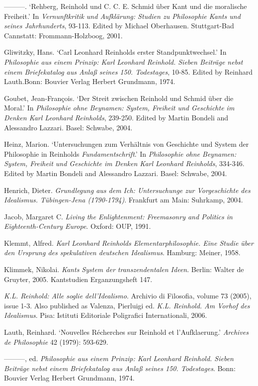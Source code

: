 {---}{---}{---}. `Rehberg, Reinhold und C. C. E. Schmid \"{u}ber Kant und die moralische Freiheit.' In \textit{Vernunftkritik und Aufkl\"{a}rung: Studien zu Philosophie Kants und seines Jahrhunderts}, 93{-}113. Edited by Michael Oberhausen. Stuttgart{-}Bad Cannstatt: Frommann{-}Holzboog, 2001. 

Gliwitzky, Hans. `Carl Leonhard Reinholds erster Standpunktwechsel.' In \textit{Philosophie aus einem Prinzip: Karl Leonhard Reinhold. Sieben Beitr\"{a}ge nebst einem Briefekatalog aus Anla\ss{} seines 150. Todestages}, 10{-}85. Edited by Reinhard Lauth.Bonn: Bouvier Verlag Herbert Grundmann, 1974.

Goubet, Jean{-}Fran\c{c}ois. `Der Streit zwischen Reinhold und Schmid \"{u}ber die Moral.' In \textit{Philosophie ohne Beynamen: System, Freiheit und Geschichte im Denken Karl Leonhard Reinholds}, 239{-}250. Edited by Martin Bondeli and Alessandro Lazzari. Basel: Schwabe, 2004.

Heinz, Marion. `Untersuchungen zum Verh\"{a}ltnis von Geschichte und System der Philosophie in Reinholds \textit{Fundamentschrift}.' In \textit{Philosophie ohne Beynamen: System, Freiheit und Geschichte im Denken Karl Leonhard Reinholds}, 334{-}346. Edited by Martin Bondeli and Alessandro Lazzari. Basel: Schwabe, 2004.

Henrich, Dieter. \textit{Grundlegung aus dem Ich: Untersuchunge zur Vorgeschichte des Idealismus. T\"{u}bingen{-}Jena (1790{-}1794)}. Frankfurt am Main: Suhrkamp, 2004.

Jacob, Margaret C. \textit{Living the Enlightenment: Freemasonry and Politics in Eighteenth{-}Century Europe}. Oxford: OUP, 1991. 

Klemmt, Alfred. \textit{Karl Leonhard Reinholds Elementarphilosophie. Eine Studie \"{u}ber den Ursprung des spekulativen deutschen Idealismus}. Hamburg: Meiner, 1958.

Klimmek, Nikolai. \textit{Kants System der transzendentalen Ideen}. Berlin: Walter de Gruyter, 2005. Kantstudien Erganzungsheft 147.

\textit{K.L. Reinhold: Alle soglie dell'Idealismo}. Archivio di Filosofia, volume 73 (2005), issue 1{-}3. Also published as Valenza, Pierluigi ed.\textit{ K.L. Reinhold. Am Vorhof des Idealismus}. Pisa: Istituti Editoriale Poligrafici Internationali, 2006.

Lauth, Reinhard. `Nouvelles R\'{e}cherches sur Reinhold et l'Aufklaerung.' \textit{Archives de Philosophie} 42 (1979): 593{-}629.

{---}{---}{---}, ed. \textit{Philosophie aus einem Prinzip: Karl Leonhard Reinhold. Sieben Beitr\"{a}ge nebst einem Briefekatalog aus Anla\ss{} seines 150. Todestages}. Bonn: Bouvier Verlag Herbert Grundmann, 1974.

